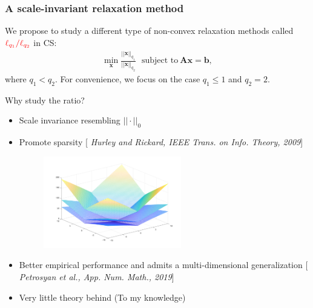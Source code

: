 \documentclass[11pt]{beamer}
\def\A{{\mathbf A}}
\def\x{{\mathbf x}}
\def\b{{\mathbf b}}
\begin{document}
\begin{frame}
\frametitle{A scale-invariant relaxation method}
We propose to study a different type of non-convex relaxation methods called ${\color{red}\ell_{q_1}/\ell_{q_2}}$ in CS:
\begin{align*}
\min_{\x}\frac{||\x||_{q_1}}{||\x||_{q_2}}\ \ \ \text{subject to}\ \A\x=\b,
\end{align*}
where $q_1<q_2$. For convenience, we focus on the case $q_1\leq 1$ and $q_2=2$.  
\end{frame}

\begin{frame}
{Why study the ratio?}
\begin{itemize}
\item Scale invariance resembling $|| \cdot||_0$

\item Promote sparsity [{\color{blue} \it Hurley and Rickard, IEEE Trans. on Info. Theory, 2009}]

\begin{figure}
\begin{center}
\includegraphics[width=6cm]{levelset.png}
\end{center}
\end{figure}


\item Better empirical performance and admits a multi-dimensional generalization [{\color{blue} \it Petrosyan et al., App. Num. Math., 2019}]


\item {\color{red} Very little theory behind} (To my knowledge) 
\end{itemize}
\end{frame}
\end{document}
